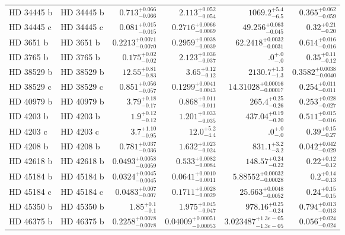 \begin{longtable*}{llrrrr}
HD 34445 b & HD 34445 b & $0.713^{+0.066}_{-0.066}$ & $2.113^{+0.052}_{-0.054}$ & $1069.2^{+5.4}_{-6.5}$ & $0.365^{+0.062}_{-0.059}$ \\ 
HD 34445 c & HD 34445 c & $0.081^{+0.015}_{-0.015}$ & $0.2716^{+0.0066}_{-0.0069}$ & $49.256^{+0.063}_{-0.045}$ & $0.32^{+0.21}_{-0.20}$ \\ 
HD 3651 b & HD 3651 b & $0.2213^{+0.0071}_{-0.0070}$ & $0.2959^{+0.0038}_{-0.0039}$ & $62.2418^{+0.0032}_{-0.0031}$ & $0.614^{+0.016}_{-0.016}$ \\ 
HD 3765 b & HD 3765 b & $0.175^{+0.02}_{-0.02}$ & $2.123^{+0.036}_{-0.037}$ & $.0^{+.0}_{-.0}$ & $0.35^{+0.11}_{-0.12}$ \\ 
HD 38529 b & HD 38529 b & $12.55^{+0.81}_{-0.83}$ & $3.65^{+0.12}_{-0.12}$ & $2130.7^{+1.3}_{-1.3}$ & $0.3582^{+0.0038}_{-0.0040}$ \\ 
HD 38529 c & HD 38529 c & $0.851^{+0.056}_{-0.057}$ & $0.1299^{+0.0041}_{-0.0043}$ & $14.31028^{+0.00016}_{-0.00017}$ & $0.254^{+0.011}_{-0.011}$ \\ 
HD 40979 b & HD 40979 b & $3.79^{+0.18}_{-0.17}$ & $0.868^{+0.011}_{-0.011}$ & $265.4^{+0.25}_{-0.26}$ & $0.253^{+0.028}_{-0.027}$ \\ 
HD 4203 b & HD 4203 b & $1.9^{+0.12}_{-0.12}$ & $1.201^{+0.033}_{-0.035}$ & $437.04^{+0.19}_{-0.20}$ & $0.511^{+0.015}_{-0.016}$ \\ 
HD 4203 c & HD 4203 c & $3.7^{+1.10}_{-0.95}$ & $12.0^{+5.2}_{-4.4}$ & $.0^{+.0}_{-.0}$ & $0.39^{+0.15}_{-0.27}$ \\ 
HD 4208 b & HD 4208 b & $0.781^{+0.037}_{-0.036}$ & $1.632^{+0.023}_{-0.024}$ & $831.1^{+3.2}_{-3.2}$ & $0.042^{+0.042}_{-0.029}$ \\ 
HD 42618 b & HD 42618 b & $0.0493^{+0.0058}_{-0.0059}$ & $0.533^{+0.0082}_{-0.0084}$ & $148.57^{+0.24}_{-0.22}$ & $0.22^{+0.12}_{-0.12}$ \\ 
HD 45184 b & HD 45184 b & $0.0324^{+0.0045}_{-0.0045}$ & $0.0641^{+0.0010}_{-0.0011}$ & $5.88552^{+0.00032}_{-0.00028}$ & $0.2^{+0.14}_{-0.13}$ \\ 
HD 45184 c & HD 45184 c & $0.0483^{+0.007}_{-0.007}$ & $0.1711^{+0.0028}_{-0.0029}$ & $25.663^{+0.0048}_{-0.0052}$ & $0.24^{+0.15}_{-0.15}$ \\ 
HD 45350 b & HD 45350 b & $1.85^{+0.1}_{-0.1}$ & $1.975^{+0.045}_{-0.047}$ & $978.16^{+0.25}_{-0.24}$ & $0.794^{+0.013}_{-0.013}$ \\ 
HD 46375 b & HD 46375 b & $0.2258^{+0.0078}_{-0.0078}$ & $0.04009^{+0.00051}_{-0.00053}$ & $3.023487^{+1.3e-05}_{-1.3e-05}$ & $0.056^{+0.024}_{-0.024}$ \\ 

\end{longtable*}
